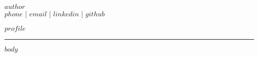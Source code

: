 \documentclass[10pt,A4]{article}
\begin{document}
\pagestyle{fancy}

\vspace{-8pt}
\begin{center}
	{\selectfont\HUGE \textsc{$author$}} \\[4pt]
    \vspace{2pt}
        \normalsize $phone$ \hspace{0.1em}|\hspace{0.1em} $email$ \hspace{0.1em}|\hspace{0.1em} $linkedin$ \hspace{0.1em}|\hspace{0.1em} $github$ \\[10pt]
        \begin{minipage}{0.8\textwidth}
            \justifying
            \normalsize\textit{$profile$}
        \end{minipage}
\end{center}

\vspace{8pt}
\textcolor{softcol}{\hrule}
\vspace{7pt}

\normalsize



$body$
\end{document}
